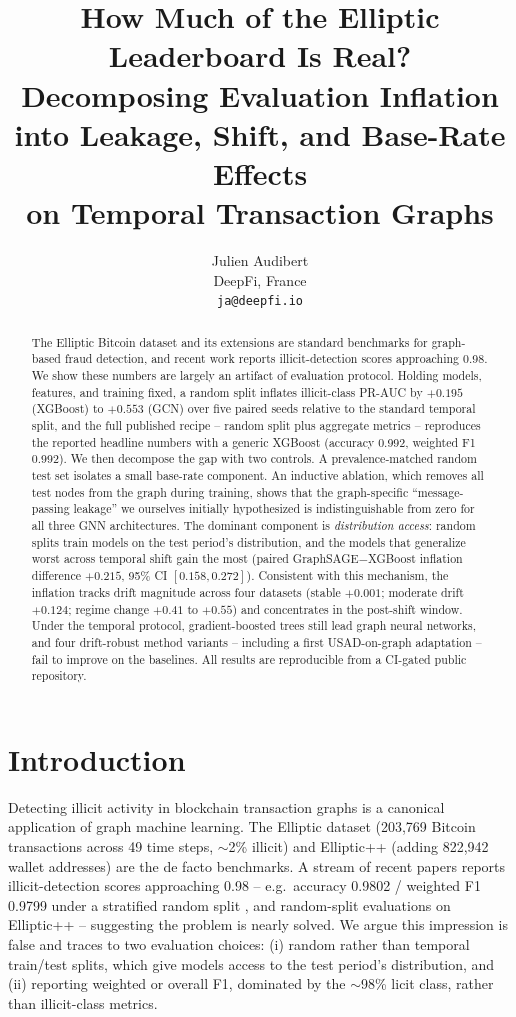 \documentclass[11pt]{article}
\title{How Much of the Elliptic Leaderboard Is Real?\\
Decomposing Evaluation Inflation into Leakage, Shift, and Base-Rate Effects\\
on Temporal Transaction Graphs}
\author{Julien Audibert\\ DeepFi, France\\ \texttt{ja@deepfi.io}}
\date{}
\begin{document}
\maketitle

\begin{abstract}
The Elliptic Bitcoin dataset and its extensions are standard benchmarks for
graph-based fraud detection, and recent work reports illicit-detection scores
approaching 0.98. We show these numbers are largely an artifact of evaluation
protocol. Holding models, features, and training fixed, a random split inflates
illicit-class PR-AUC by $+0.195$ (XGBoost) to $+0.553$ (GCN) over five paired
seeds relative to the standard temporal split, and the full published recipe --
random split plus aggregate metrics -- reproduces the reported headline numbers
with a generic XGBoost (accuracy 0.992, weighted F1 0.992). We then decompose the
gap with two controls. A prevalence-matched random test set isolates a small
base-rate component. An inductive ablation, which removes all test nodes from the
graph during training, shows that the graph-specific ``message-passing leakage''
we ourselves initially hypothesized is indistinguishable from zero for all three
GNN architectures. The dominant component is \emph{distribution access}: random
splits train models on the test period's distribution, and the models that
generalize worst across temporal shift gain the most (paired GraphSAGE$-$XGBoost
inflation difference $+0.215$, 95\% CI $[0.158, 0.272]$). Consistent with this
mechanism, the inflation tracks drift magnitude across four datasets (stable
$+0.001$; moderate drift $+0.124$; regime change $+0.41$ to $+0.55$) and
concentrates in the post-shift window. Under the temporal protocol,
gradient-boosted trees still lead graph neural networks, and four drift-robust
method variants -- including a first USAD-on-graph adaptation -- fail to improve
on the baselines. All results are reproducible from a CI-gated public repository.
\end{abstract}

\section{Introduction}
Detecting illicit activity in blockchain transaction graphs is a canonical
application of graph machine learning. The Elliptic dataset
\citep{weber2019aml} (203{,}769 Bitcoin transactions across 49 time steps,
$\sim$2\% illicit) and Elliptic++ \citep{elmougy2023elliptic} (adding 822{,}942
wallet addresses) are the de facto benchmarks. A stream of recent papers reports
illicit-detection scores approaching 0.98 -- e.g.\ accuracy 0.9802 / weighted F1
0.9799 under a stratified random split \citep{lin2026wavelet}, and random-split
evaluations on Elliptic++ \citep{nguyen2025sagefin} -- suggesting the problem is
nearly solved. We
argue this impression is false and traces to two evaluation choices: (i) random
rather than temporal train/test splits, which give models access to the test
period's distribution, and (ii) reporting weighted or overall F1, dominated by the
$\sim$98\% licit class, rather than illicit-class metrics.
\end{document}
